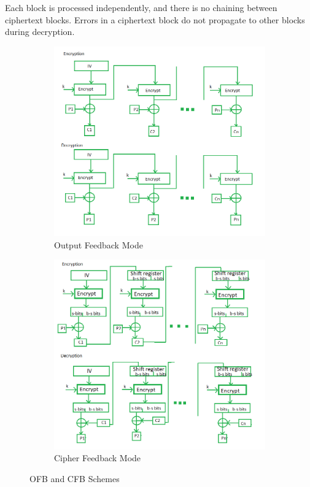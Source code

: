 Each block is processed independently, and there is no chaining between ciphertext blocks. Errors in a ciphertext block do not propagate to other blocks during decryption. \\

\begin{figure}[h!]
    \centering
    \begin{subfigure}[t]{0.40\textwidth}
        \centering
        \includegraphics[width=\textwidth]{img/output-feedback-mode.png}
        \caption{Output Feedback Mode}
    \end{subfigure}
    \hfill
    \begin{subfigure}[t]{0.40\textwidth}
        \centering
        \includegraphics[width=\textwidth]{img/cipher-feedback-mode.png}
        \caption{Cipher Feedback Mode}
    \end{subfigure}
    \caption{OFB and CFB Schemes}
\end{figure}

